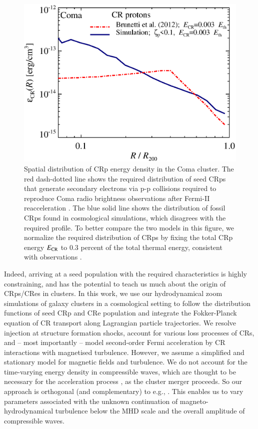 \documentclass[a4paper,fleqn,usenatbib]{mnras}
\begin{document}
\begin{figure}
  \includegraphics[width=1.0\columnwidth]{fCR.radius.coma.g72a.Rad14.2400p.z0.NL.xKR.eb23.eI067.DII.140.v6.eps}
  \caption{Spatial distribution of CRp energy density in the Coma
    cluster. The red dash-dotted line shows the required distribution
    of seed CRps that generate secondary electrons via p-p collisions
    required to reproduce Coma radio brightness observations after
    Fermi-II reacceleration \citep{brunetti12}. The blue solid line
    shows the distribution of fossil CRps found in cosmological
    simulations, which disagrees with the required profile. To better
    compare the two models in this figure, we normalize the required
    distribution of CRps by fixing the total CRp energy $E_{\mathrm{CR}}$
    to 0.3 percent of the total thermal energy, consistent with
    observations \citep{2014ApJ...787...18A,2012ApJ...757..123A}.}
  \label{fig:Edens}
\end{figure}

Indeed, arriving at a seed population with the required
characteristics is highly constraining, and has the potential to teach
us much about the origin of CRps/CRes in clusters.  In this work, we
use our hydrodynamical zoom simulations of galaxy clusters in a
cosmological setting to follow the distribution functions of seed CRp
and CRe population and integrate the Fokker-Planck equation of CR
transport along Lagrangian particle trajectories. We resolve injection
at structure formation shocks, account for various loss processes of
CRs, and -- most importantly -- model second-order Fermi acceleration
by CR interactions with magnetised turbulence. However, we assume a
simplified and stationary model for magnetic fields and turbulence. We
do not account for the time-varying energy density in compressible
waves, which are thought to be necessary for the acceleration process
\citep{brunetti07,brunetti11}, as the cluster merger proceeds.  So our
approach is orthogonal (and complementary) to e.g.,
\citealp{2015ApJ...800...60M}. This enables us to vary parameters
associated with the unknown continuation of magneto-hydrodynamical
turbulence below the MHD scale and the overall amplitude of
compressible waves.
\end{document}
